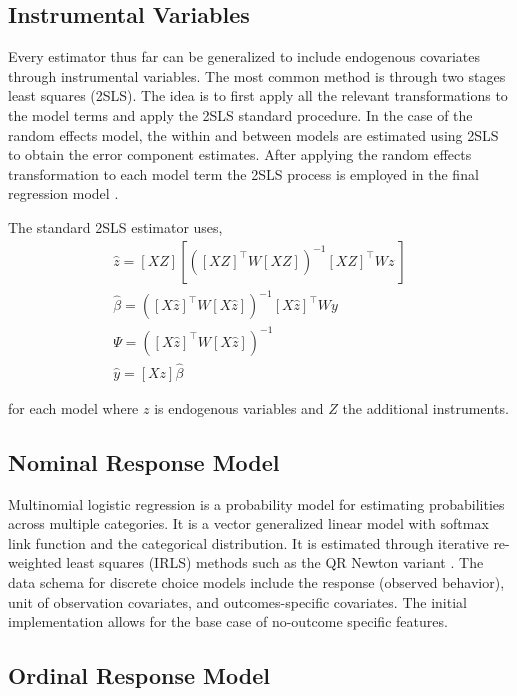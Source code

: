 \documentclass{juliacon}
\begin{document}
\subsection{Instrumental Variables}

Every estimator thus far can be generalized to include endogenous covariates through instrumental variables. The most common method is through two stages least squares (2SLS). The idea is to first apply all the relevant transformations to the model terms and apply the 2SLS standard procedure. In the case of the random effects model, the within and between models are estimated using 2SLS to obtain the error component estimates. After applying the random effects transformation to each model term the 2SLS process is employed in the final regression model \cite{BV_1987}.

The standard 2SLS estimator uses,
\begin{equation}
\begin{split}
\hat{z} = [X Z] \left[ \left( [X Z]^{\top} W [X Z] \right)^{-1} [X Z]^{\top} W z\ \right] \\
\hat{\beta} = \left( [X \hat{z}]^{\top} W [X \hat{z}] \right)^{-1} [X \hat{z}]^{\top} W y \\
\Psi = \left( [X \hat{z}]^{\top} W [X \hat{z}] \right)^{-1} \\
\hat{y} = [X z] \hat{\beta}
\end{split}
\end{equation}

for each model where $z$ is endogenous variables and $Z$ the additional instruments.

\subsection{Nominal Response Model}

Multinomial logistic regression is a probability model for estimating probabilities across multiple categories. It is a vector generalized linear model with softmax link function and the categorical distribution. It is estimated through iterative re-weighted least squares (IRLS) methods such as the QR Newton variant \cite{OLeary_1990}. The data schema for discrete choice models include the response (observed behavior), unit of observation covariates, and outcomes-specific covariates. The initial implementation allows for the base case of no-outcome specific features.

\subsection{Ordinal Response Model}
\end{document}
